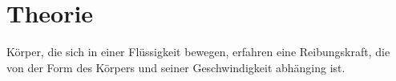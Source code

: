 \section{Theorie}

Körper, die sich in einer Flüssigkeit bewegen, erfahren eine
Reibungskraft, die von der Form des Körpers und seiner Geschwindigkeit
abhänging ist. 